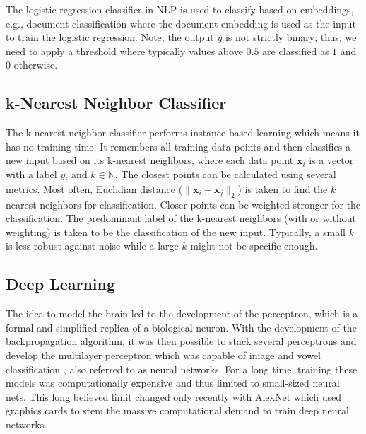   The logistic regression classifier in NLP is used to classify based on embeddings, e.g., document classification where the document embedding is used as the input to train the logistic regression.
  Note, the output $\hat{y}$ is not strictly binary; thus, we need to apply a threshold where typically values above $0.5$ are classified as $1$ and $0$ otherwise.

\subsection{k-Nearest Neighbor Classifier}
  The k-nearest neighbor classifier performs instance-based learning which means it has no training time.
  It remembers all training data points and then classifies a new input based on its k-nearest neighbors, where each data point $\mathbf{x}_i$ is a vector with a label $y_i$ and $k \in \mathbb{N}$.
  The closest points can be calculated using several metrics.
  Most often, Euclidian distance ($\| \mathbf{x}_i - \mathbf{x}_j\|_2$) is taken to find the $k$ nearest neighbors for classification.
  Closer points can be weighted stronger for the classification.
  The predominant label of the k-nearest neighbors (with or without weighting) is taken to be the classification of the new input.
  Typically, a small $k$ is less robust against noise while a large $k$ might not be specific enough.

\subsection{Deep Learning}
  The idea to model the brain led to the development of the perceptron, which is a formal and simplified replica of a biological neuron.
  With the development of the backpropagation algorithm, it was then possible to stack several perceptrons and develop the multilayer perceptron which was capable of image and vowel classification \citep{Russell2009}, also referred to as neural networks.
  For a long time, training these models was computationally expensive and thus limited to small-sized neural nets.
  This long believed limit changed only recently with AlexNet \citep{Krizhevsky2012} which used graphics cards to stem the massive computational demand to train deep neural networks.

